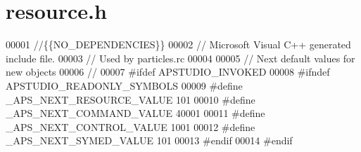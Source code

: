 \hypertarget{resource_8h_source}{\section{resource.\-h}
}

\begin{DoxyCode}
00001 \textcolor{comment}{//\{\{NO\_DEPENDENCIES\}\}}
00002 \textcolor{comment}{// Microsoft Visual C++ generated include file.}
00003 \textcolor{comment}{// Used by particles.rc}
00004 
00005 \textcolor{comment}{// Next default values for new objects}
00006 \textcolor{comment}{// }
00007 \textcolor{preprocessor}{#}\textcolor{preprocessor}{ifdef} \textcolor{preprocessor}{APSTUDIO\_INVOKED}
00008 \textcolor{preprocessor}{#}\textcolor{preprocessor}{ifndef} \textcolor{preprocessor}{APSTUDIO\_READONLY\_SYMBOLS}
00009 \textcolor{preprocessor}{#}\textcolor{preprocessor}{define} \textcolor{preprocessor}{\_APS\_NEXT\_RESOURCE\_VALUE}        101
00010 \textcolor{preprocessor}{#}\textcolor{preprocessor}{define} \textcolor{preprocessor}{\_APS\_NEXT\_COMMAND\_VALUE}         40001
00011 \textcolor{preprocessor}{#}\textcolor{preprocessor}{define} \textcolor{preprocessor}{\_APS\_NEXT\_CONTROL\_VALUE}         1001
00012 \textcolor{preprocessor}{#}\textcolor{preprocessor}{define} \textcolor{preprocessor}{\_APS\_NEXT\_SYMED\_VALUE}           101
00013 \textcolor{preprocessor}{#}\textcolor{preprocessor}{endif}
00014 \textcolor{preprocessor}{#}\textcolor{preprocessor}{endif}
\end{DoxyCode}
